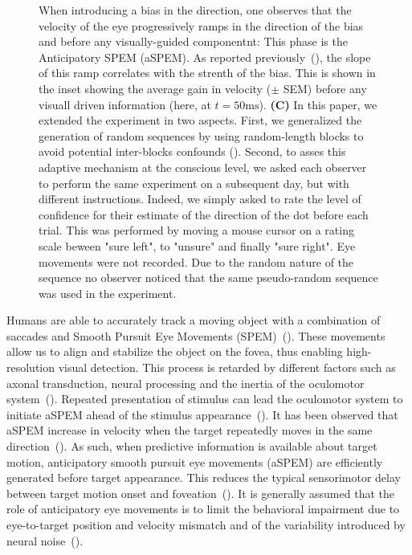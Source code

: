 \documentclass[profile,final,english, draft]{article}%
\newcommand{\ms}{\si{\milli\second}}%
\newcommand{\citep}[1]{(\cite{#1})}
\begin{document}
\begin{figure}
{When introducing a bias in the direction,
one observes that the velocity of the eye progressively ramps
in the direction of the bias and before any visually-guided componentnt:
This phase is the Anticipatory SPEM (aSPEM).
As reported previously~\citep{Montagnini2010, SantosKowler2017},
the slope of this ramp correlates with the strenth of the bias.
This is shown in the inset showing the average gain in velocity ($\pm$ SEM)
before any visuall driven information (here, at $t=50 \ms$).
\textbf{(C)} In this paper, we extended the experiment in two aspects.
First, we generalized the generation of random sequences
by using random-length blocks to avoid potential inter-blocks confounds ().
Second, to asses this adaptive mechanism at the conscious level,
we asked each observer to perform the same experiment on a subsequent day,
but with different instructions.
Indeed, we simply asked to rate the level of confidence for their estimate of the direction of the dot before each trial.
This was performed by moving a mouse cursor on a rating scale beween "sure left", to "unsure" and finally "sure right".
Eye movements were not recorded.
Due to the random nature of the sequence no observer noticed that the same pseudo-random sequence was used in the experiment.
 }
\label{fig:intro}
\end{figure}
Humans are able to accurately track a moving object
with a combination of saccades and
Smooth Pursuit Eye Movements (SPEM)~\citep{ref}.
These movements allow us to align and
stabilize the object on the fovea,
thus enabling high-resolution visual detection.
This process is retarded by different factors such as axonal transduction, neural processing and the inertia of the oculomotor system~\citep{Krauzlis}.
Repeated presentation of stimulus can lead the oculomotor system
to initiate aSPEM ahead of the stimulus appearance~\citep{Westheimer1954, KOWLER1979619, KOWLER1979633}.
It has been observed that aSPEM increase in velocity
when the target repeatedly moves in the same direction~\citep{Kowler1984, Kowler1989, Heinen2005}.
As such, when predictive information is available about target motion,
anticipatory smooth pursuit eye movements (aSPEM) are
efficiently generated before target appearance.
This reduces the typical sensorimotor delay
between target motion onset and foveation~\citep{PerrinetAdamasFriston2014}.
It is generally assumed that the role of anticipatory eye movements is
to limit the behavioral impairment due
to eye-to-target position and velocity mismatch and
of the variability introduced by neural noise~\citep{WolpertXXX}.
\end{document}
